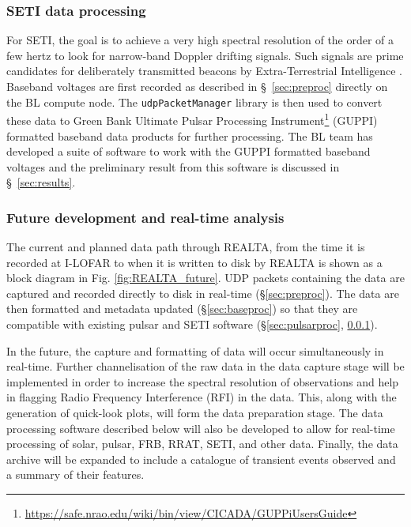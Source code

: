 

\subsubsection{SETI data processing}
\label{sect:pipeline_SETI}
For SETI, the goal is to achieve a very high spectral resolution of the order of a few hertz to look for narrow-band Doppler drifting signals. Such signals are prime candidates for deliberately transmitted beacons by Extra-Terrestrial Intelligence \citep[ETI;][]{Tarter2001}. Baseband voltages are first recorded as described in \S~\ref{sec:preproc} directly on the BL compute node. The \texttt{udpPacketManager} library is then used to convert these data to Green Bank Ultimate Pulsar Processing Instrument\footnote{\hyperref[GUPPI]{https://safe.nrao.edu/wiki/bin/view/CICADA/GUPPiUsersGuide}} (GUPPI) formatted baseband data products for further processing. The BL team has developed a suite of software to work with the GUPPI formatted baseband voltages \citep{Lebofsky2019} and the preliminary result from this software is discussed in \S~\ref{sec:results}. 

\subsubsection{Future development and real-time analysis}
\label{sec:future_software}
The current and planned data path through REALTA, from the time it is recorded at I-LOFAR to when it is written to disk by REALTA is shown as a block diagram in Fig. \ref{fig:REALTA_future}. UDP packets containing the data are captured and recorded directly to disk in real-time (\S \ref{sec:preproc}). The data are then formatted and metadata updated (\S \ref{sec:baseproc}) so that they are compatible with existing pulsar and SETI software (\S \ref{sec:pulsarproc}, \ref{sect:pipeline_SETI}).

In the future, the capture and formatting of data will occur simultaneously in real-time. Further channelisation of the raw data in the data capture stage will be implemented in order to increase the spectral resolution of observations and help in flagging Radio Frequency Interference (RFI) in the data. This, along with the generation of quick-look plots, will form the data preparation stage. The data processing software described below will also be developed to allow for real-time processing of solar, pulsar, FRB, RRAT, SETI, and other data. Finally, the data archive will be expanded to include a catalogue of transient events observed and a summary of their features.

